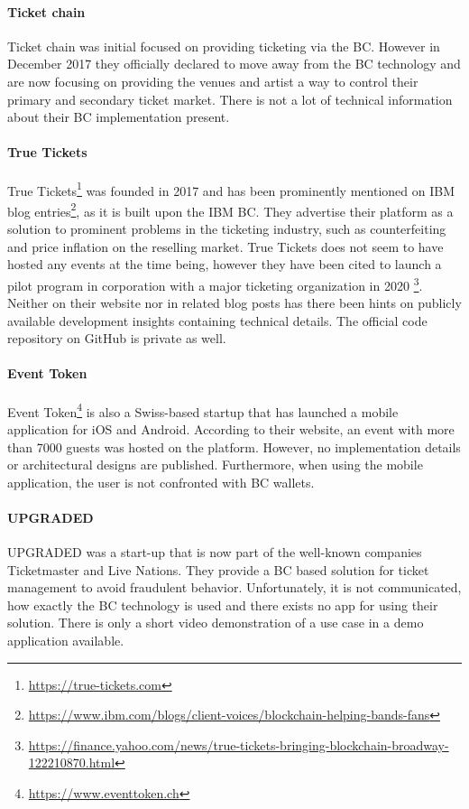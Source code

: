 \paragraph{Ticket chain}
Ticket chain \cite{TicketChain} was initial  focused on providing ticketing via the BC. However in December 2017 they officially declared to move away from the BC technology and are now focusing on providing the venues and artist a way to control their primary and secondary ticket market. There is not a lot of technical information about their BC implementation present. 

\paragraph{True Tickets}
True Tickets\footnote{\href{https://true-tickets.com/}{https://true-tickets.com}} was founded in 2017 and has been prominently mentioned on IBM blog entries\footnote{\href{https://www.ibm.com/blogs/client-voices/blockchain-helping-bands-fans/}{https://www.ibm.com/blogs/client-voices/blockchain-helping-bands-fans}}, as it is built upon the IBM BC. They advertise their platform as a solution to prominent problems in the ticketing industry, such as counterfeiting and price inflation on the reselling market. True Tickets does not seem to have hosted any events at the time being, however they have been cited to launch a pilot program in corporation with a major ticketing organization in 2020 \footnote{\href{https://finance.yahoo.com/news/true-tickets-bringing-blockchain-broadway-122210870.html}{https://finance.yahoo.com/news/true-tickets-bringing-blockchain-broadway-122210870.html}}.
Neither on their website nor in related blog posts has there been hints on publicly available development insights containing technical details. The official code repository on GitHub is private as well.

\paragraph{Event Token}
Event Token\footnote{\href{https://www.eventtoken.ch/}{https://www.eventtoken.ch}} is also a Swiss-based startup that has launched a mobile application for iOS and Android. According to their website, an event with more than 7000 guests was hosted on the platform. However, no implementation details or architectural designs are published. Furthermore, when using the mobile application, the user is not confronted with BC wallets. 

\paragraph{UPGRADED} UPGRADED \cite{UPGRADED} was a start-up that is now part of the well-known companies Ticketmaster and Live Nations. They provide a BC based solution for ticket management to avoid fraudulent behavior. Unfortunately, it is not communicated, how exactly the BC technology is used and there exists no app for using their solution. There is only a short video demonstration of a use case in a demo application available.

